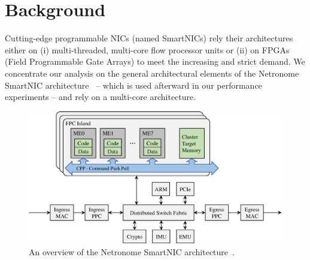 \section{Background} 

Cutting-edge programmable NICs (named SmartNICs) rely their architectures either on (i) multi-threaded, multi-core flow processor units or (ii) on FPGAs (Field Programmable Gate Arrays) to meet the increasing and strict demand. We concentrate our analysis on the general architectural elements of the Netronome SmartNIC architecture~\cite{netronomeArc} -- which is used afterward in our performance experiments -- and rely on a multi-core architecture. 

\begin{figure}[!htb]
\centering
\includegraphics[scale=0.3]{img/architecture.eps}
\caption{An overview of the Netronome SmartNIC architecture~\cite{aina2021}.}
\label{fig-architecture}
\end{figure}


